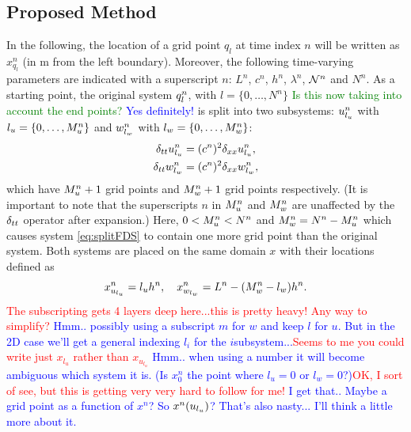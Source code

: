 \documentclass[fleqn]{jaes}
\def\SBcomment[#1]{\textcolor{red}{#1}}
\def\SWcomment[#1]{\textcolor{blue}{#1}}
\def\MDcomment[#1]{\textcolor{green}{#1}}
\begin{document}
\subsection{Proposed Method}
In the following, the location of a grid point $q_l$ at time index $n$ will be written as $x_{q_l}^n$ (in m from the left boundary). Moreover, the following time-varying parameters are indicated with a superscript $n$: $L^n$, $c^n$, $h^n$, $\lambda^n$, $\mathcal{N}^n$ and $N^n$. %
As a starting point, the original system $q_l^n$, with $l=\{0, \hdots, N^n\}$ \MDcomment[Is this now taking into account the end points?] \SWcomment[Yes definitely!] is split into two subsystems: $u_{l_u}^n$ with $l_u=\{0, \hdots, M_u^n\}$ and $w_{l_w}^n$ with  $l_w=\{0, \hdots, M_w^n\}$:
\begin{subequations}\label{eq:splitFDS}
    \begin{align}
        \delta_{tt} u_{l_u}^n &= (c^n)^2\delta_{xx} u_{l_u}^n,\\
        \delta_{tt} w_{l_w}^n &= (c^n)^2\delta_{xx} w_{l_w}^n,
    \end{align}
\end{subequations}
which have $M_u^n+1$ grid points and $M_w^n+1$ grid points respectively. (It is important to note that the superscripts $n$ in $M_u^n$ and $M_w^n$ are unaffected by the $\delta_{tt}$ operator after expansion.) Here, $0<M_u^n<N^n$ and $M_w^n = N^n - M_u^n$ which causes system \eqref{eq:splitFDS} to contain one more grid point than the original system. Both systems are placed on the same domain $x$ with their locations defined as
\begin{equation}\label{eq:gridLocations}
    x_{u_\lu}^n =\lu h^n, \quad x_{w_\lw}^n = L^n-(\Mw-\lw)h^n.
\end{equation}
\SBcomment[The subscripting gets 4 layers deep here...this is pretty heavy! Any way to simplify?] \SWcomment[Hmm.. possibly using a subscript $m$ for $w$ and keep $l$ for $u$. But in the 2D case we'll get a general indexing $l_i$ for the $i$\th subsystem...]\SBcomment[Seems to me you could write just $x_{l_{u}}$ rather than $x_{u_{l_{u}}}$] \SWcomment[Hmm.. when using a number it will become ambiguous which system it is. (Is $x_0^n$ the point where $l_u = 0$ or $l_w = 0$?)]\SBcomment[OK, I sort of see, but this is getting very very hard to follow for me!] \SWcomment[I get that.. Maybe a grid point as a function of $x^n$? So $x^n(u_{l_u})$? That's also nasty... I'll think a little more about it.]
\end{document}
